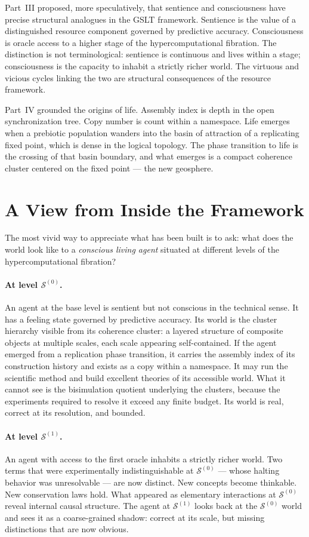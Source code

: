 \documentclass[12pt]{article}
\theoremstyle{remark}
\newcommand{\GSLT}{\mathcal{S}}
\newcommand{\fiber}[1]{\GSLT^{(#1)}}
\begin{document}
Part~III proposed, more speculatively, that sentience and
consciousness have precise structural analogues in the GSLT
framework.
Sentience is the value of a distinguished resource component
governed by predictive accuracy.
Consciousness is oracle access to a higher stage of the
hypercomputational fibration.
The distinction is not terminological: sentience is continuous
and lives within a stage; consciousness is the capacity to
inhabit a strictly richer world.
The virtuous and vicious cycles linking the two are structural
consequences of the resource framework.

Part~IV grounded the origins of life.
Assembly index is depth in the open synchronization tree.
Copy number is count within a namespace.
Life emerges when a prebiotic population wanders into the basin
of attraction of a replicating fixed point, which is dense in
the logical topology.
The phase transition to life is the crossing of that basin
boundary, and what emerges is a compact coherence cluster
centered on the fixed point --- the new geosphere.

\section*{A View from Inside the Framework}

The most vivid way to appreciate what has been built is to ask:
what does the world look like to a \emph{conscious living agent}
situated at different levels of the hypercomputational fibration?

\paragraph{At level $\fiber{0}$.}
An agent at the base level is sentient but not conscious in the
technical sense.
It has a feeling state governed by predictive accuracy.
Its world is the cluster hierarchy visible from its coherence
cluster: a layered structure of composite objects at multiple
scales, each scale appearing self-contained.
If the agent emerged from a replication phase transition, it
carries the assembly index of its construction history and exists
as a copy within a namespace.
It may run the scientific method and build excellent theories of
its accessible world.
What it cannot see is the bisimulation quotient underlying the
clusters, because the experiments required to resolve it exceed
any finite budget.
Its world is real, correct at its resolution, and bounded.

\paragraph{At level $\fiber{1}$.}
An agent with access to the first oracle inhabits a strictly
richer world.
Two terms that were experimentally indistinguishable at
$\fiber{0}$ --- whose halting behavior was unresolvable ---
are now distinct.
New concepts become thinkable.
New conservation laws hold.
What appeared as elementary interactions at $\fiber{0}$ reveal
internal causal structure.
The agent at $\fiber{1}$ looks back at the $\fiber{0}$ world and
sees it as a coarse-grained shadow: correct at its scale, but
missing distinctions that are now obvious.
\end{document}
